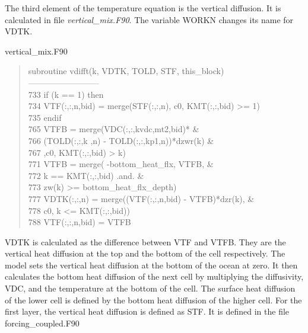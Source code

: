 The third element of the temperature equation is the vertical diffusion. It is calculated in file \textit{vertical\_mix.F90}. The variable WORKN changes its name for VDTK. 
\begin{center} vertical\_mix.F90 \end{center}
\begin{quotation}
\small
\linespread{0.5}\selectfont{} \hspace{1em} subroutine vdifft(k, VDTK, TOLD, STF, this\_block)\\
\hspace{1em} --------------------------\\
733 \hspace{1em} if (k == 1) then\\
734 \hspace{1em}        VTF(:,:,n,bid) = merge(STF(:,:,n), c0, KMT(:,:,bid) >= 1)\\
735 \hspace{1em}     endif\\
765 \hspace{1em}         VTFB = merge(VDC(:,:,kvdc,mt2,bid)*                      \&\\
766 \hspace{1em}                     (TOLD(:,:,k  ,n) - TOLD(:,:,kp1,n))*dzwr(k) \&\\
767 \hspace{1em}                     ,c0, KMT(:,:,bid) > k)\\
771  \hspace{1em}          VTFB = merge( -bottom\_heat\_flx, VTFB,      \&\\
 772  \hspace{1em}                      k == KMT(:,:,bid) .and.       \&\\
773   \hspace{1em}                      zw(k) >= bottom\_heat\_flx\_depth)\\
777   \hspace{1em}      VDTK(:,:,n) = merge((VTF(:,:,n,bid) - VTFB)*dzr(k), \&\\
 778   \hspace{1em}                         c0, k <= KMT(:,:,bid))\\
  788   \hspace{1em}       VTF(:,:,n,bid) = VTFB  \\
\end{quotation}
VDTK is calculated as the difference between VTF and VTFB. They are the vertical heat diffusion at the top and the bottom of the cell respectively. The model sets the vertical heat diffusion at the bottom of the ocean at zero. It then calculates the bottom heat diffusion of the next cell by multiplying the diffusivity, VDC, and the temperature at the bottom of the cell. The surface heat diffusion of the lower cell is defined by the bottom heat diffusion of the higher cell. For the first layer, the vertical heat diffusion is defined as STF. It is defined in the file forcing\_coupled.F90
